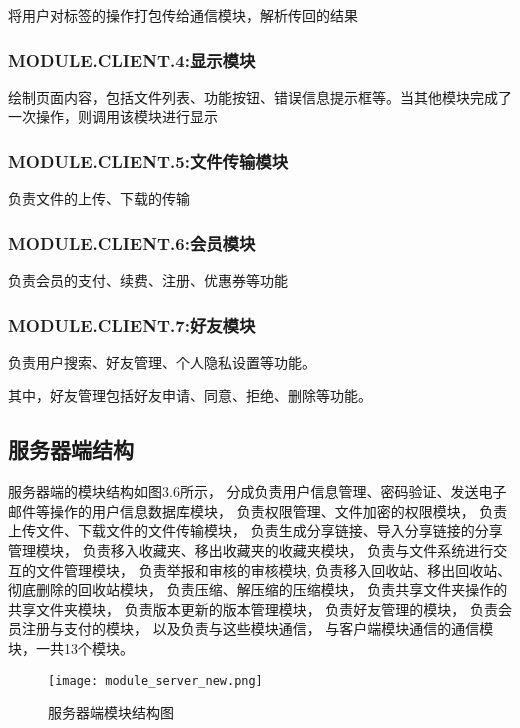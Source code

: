 将用户对标签的操作打包传给通信模块，解析传回的结果

\subsubsection{MODULE.CLIENT.4:显示模块}
绘制页面内容，包括文件列表、功能按钮、错误信息提示框等。当其他模块完成了一次操作，则调用该模块进行显示 

\subsubsection{MODULE.CLIENT.5:文件传输模块}
负责文件的上传、下载的传输

{
\color{red}

\subsubsection{MODULE.CLIENT.6:会员模块}
负责会员的支付、续费、注册、优惠券等功能

  
\subsubsection{MODULE.CLIENT.7:好友模块}
负责用户搜索、好友管理、个人隐私设置等功能。

其中，好友管理包括好友申请、同意、拒绝、删除等功能。
}

\subsection{服务器端结构}
服务器端的模块结构如图3.6所示，
分成负责用户信息管理、密码验证、发送电子邮件等操作的用户信息数据库模块，
负责权限管理、文件加密的权限模块，
负责上传文件、下载文件的文件传输模块，
负责生成分享链接、导入分享链接的分享管理模块，
负责移入收藏夹、移出收藏夹的收藏夹模块，
负责与文件系统进行交互的文件管理模块，%
负责举报和审核的审核模块,
负责移入回收站、移出回收站、彻底删除的回收站模块，
负责压缩、解压缩的压缩模块，
负责共享文件夹操作的共享文件夹模块，
负责版本更新的版本管理模块，
{\color{red}
负责好友管理的模块，
负责会员注册与支付的模块，}
以及负责与这些模块通信，
与客户端模块通信的通信模块，一共13个模块。

\begin{figure}[!h] 
\centering   
\texttt{[image: module\_server\_new.png]}
\caption{服务器端模块结构图}\label{fig:noted-figure}
\end{figure}

